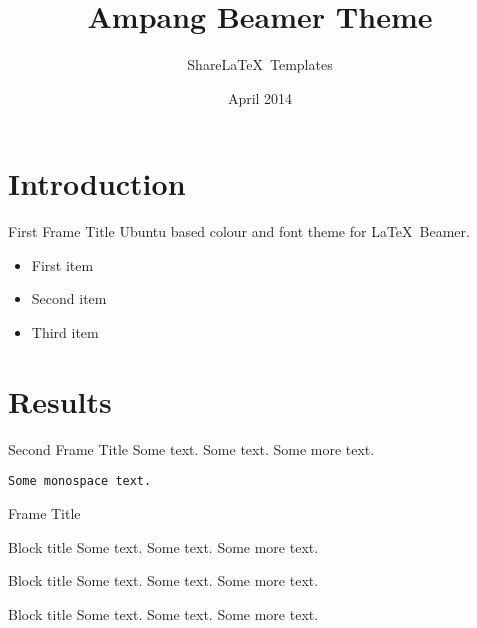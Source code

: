 \documentclass[9pt]{beamer}
\title{Ampang Beamer Theme}
\author{Share\LaTeX\ Templates}
\date{April 2014}
\institute{Share\LaTeX}
\begin{document}
\maketitle

\section{Introduction}

\begin{frame}{First Frame Title}
Ubuntu based colour and font theme for \LaTeX\ Beamer.
\begin{itemize}
\item First item
\item Second item
\item Third item
\end{itemize}
\end{frame}

\section{Results}

\begin{frame}{Second Frame Title}
Some text. Some text. Some more text.

\texttt{Some monospace text.}
\end{frame}

\begin{frame}{Frame Title}
\begin{block}{Block title}
Some text. Some text. Some more text.
\end{block}
\begin{exampleblock}{Block title}
Some text. Some text. Some more text.
\end{exampleblock}
\begin{alertblock}{Block title}
Some text. Some text. Some more text.
\end{alertblock}
\end{frame}
\end{document}
